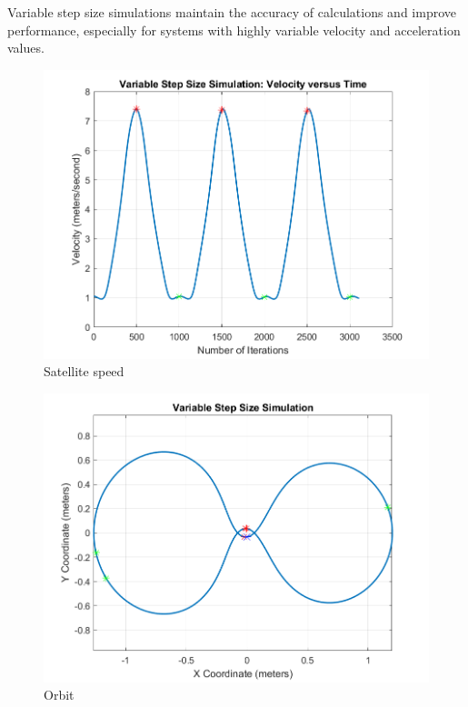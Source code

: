 \documentclass[12pt]{report}
\begin{document}
Variable step size simulations maintain the accuracy of calculations and improve performance, especially for systems with highly variable velocity and acceleration values.



\begin{figure}
    \centering
    \includegraphics[width = 0.8 \textwidth]{Figure_2.png}
    \caption{Satellite speed}
    \label{fig2}
\end{figure}

\begin{figure}
    \centering
    \includegraphics[width = 0.8 \textwidth]{Figure_3.png}
    \caption{Orbit}
\end{figure}
\end{document}
